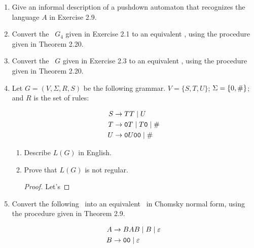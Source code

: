 \begin{enumerate}[font=\bfseries,label=2.\arabic*]
\item Give an informal description of a pushdown automaton that recognizes the language $A$ in Exercise 2.9.


\item Convert the \cfg~$G_4$ given in Exercise 2.1 to an equivalent \pda, using the procedure given in Theorem 2.20.


\item Convert the \cfg~$G$ given in Exercise 2.3 to an equivalent \pda, using the procedure given in Theorem 2.20.


\item Let $G = (V, \Sigma, R, S)$ be the following grammar. $V = \{S, T, U\}$; $\Sigma = \{0, {\tt \#}\}$; and $R$ is the set of rules:

\begin{align*}
S &\rightarrow TT \mid U\\
T &\rightarrow {\tt 0}T \mid T {\tt 0} \mid {\tt \#}\\
U &\rightarrow {\tt 0}U{\tt 00} \mid {\tt \#}
\end{align*}

\begin{enumerate}[font=\bfseries,label=\alph*.]
    \item Describe $L(G)$ in English.
    \item Prove that $L(G)$ is not regular.
    
    \begin{proof}
    
    Let's 
    
    \end{proof}
\end{enumerate}


\item Convert the following \cfg~into an equivalent \cfg~in Chomsky normal form, using the procedure given in Theorem 2.9.

\begin{align*}
A &\rightarrow BAB \mid B \mid \varepsilon\\
B &\rightarrow {\tt 00} \mid \varepsilon
\end{align*}


\end{enumerate}
